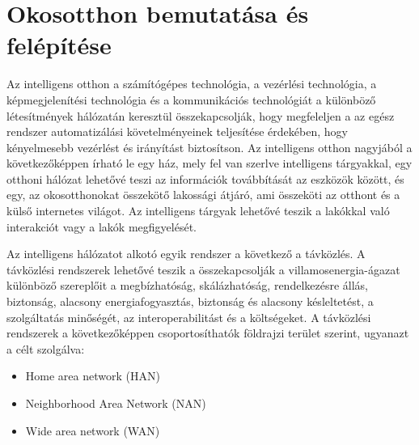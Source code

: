 \chapter{Okosotthon bemutatása és felépítése}

Az intelligens otthon a számítógépes technológia, a vezérlési technológia, a képmegjelenítési technológia és a
kommunikációs technológiát a különböző létesítmények hálózatán keresztül összekapcsolják, hogy megfeleljen a
az egész rendszer automatizálási követelményeinek teljesítése érdekében, hogy kényelmesebb vezérlést és irányítást biztosítson. Az intelligens otthon nagyjából a következőképpen írható le
egy ház, mely fel van szerlve intelligens tárgyakkal, egy otthoni
hálózat lehetővé teszi az információk továbbítását
az eszközök között, és egy, az okosotthonokat összekötő lakossági átjáró, ami összeköti az
otthont és a külső internetes világot. Az intelligens tárgyak
lehetővé teszik a lakókkal való interakciót vagy a lakók megfigyelését.
\par Az intelligens hálózatot alkotó egyik rendszer a következő
a távközlés. A távközlési rendszerek lehetővé teszik a
összekapcsolják a villamosenergia-ágazat különböző szereplőit a
megbízhatóság, skálázhatóság, rendelkezésre állás, biztonság, alacsony energiafogyasztás, biztonság és alacsony
késleltetést, a szolgáltatás minőségét, az interoperabilitást és a költségeket. 
\newline A távközlési rendszerek a következőképpen csoportosíthatók
földrajzi terület szerint, ugyanazt a célt szolgálva:
\begin{itemize}
    \setlength\itemsep{-2pt}
    \item Home area network (HAN)
    \item Neighborhood Area Network (NAN)
    \item Wide area network (WAN) 
\end{itemize}


